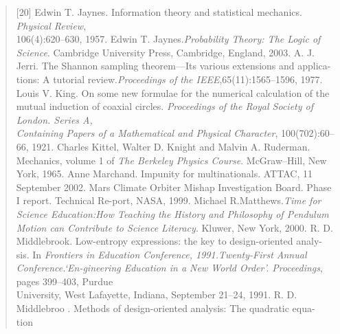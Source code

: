 \documentclass[a4paper,fleqn]{book}
\begin{document}
\begin{quote}
[20]\; Edwin T. Jaynes. Information theory and statistical mechanics. \emph{Physical Review},\\106(4):620–630, 1957.\newline\newline
[21]\; Edwin T. Jaynes.\emph{Probability Theory: The Logic of Science}. Cambridge University
Press, Cambridge, England, 2003.\newline\newline
[22]\; A. J. Jerri. The Shannon sampling theorem—Its various extensions and applica-tions:
A tutorial review.\emph{Proceedings of the IEEE},65(11):1565–1596, 1977.\newline\newline
[23]\; Louis V. King. On some new formulae for the numerical calculation of the mutual
induction of coaxial circles.  \emph{Proceedings of the Royal Society of London. Series A,\\
Containing Papers of a Mathematical and Physical Character}, 100(702):60–66, 1921.\newline\newline
[24]\; Charles Kittel, Walter D. Knight and Malvin A. Ruderman. Mechanics, volume 1
of \emph{The Berkeley Physics Course}. McGraw–Hill, New York, 1965.\newline\newline
[25]\; Anne Marchand. Impunity for multinationals. ATTAC, 11 September 2002.\newline\newline
[26]\; Mars Climate Orbiter Mishap Investigation Board. Phase I report. Technical Re-port,
NASA, 1999.\newline\newline
[27]\; Michael R.Matthews.\emph{Time for Science Education:How Teaching the History and
 Philosophy of Pendulum Motion can Contribute to Science Literacy}.   Kluwer, New
York, 2000.\newline\newline
[28]\; R. D.  Middlebrook.  Low-entropy expressions: the key to design-oriented analy-\\sis.
In \emph{Frontiers in Education Conference, 1991.Twenty-First Annual Conference.‘En-gineering  Education in a New World Order’.  Proceedings},  pages 399–403,  Purdue\\
University, West Lafayette, Indiana, September 21–24, 1991.\newline\newline
[29]\;  R. D. Middlebroo .  Methods of design-oriented analysis:  The quadratic equa-\\tion

\end{quote}
\end{document}
